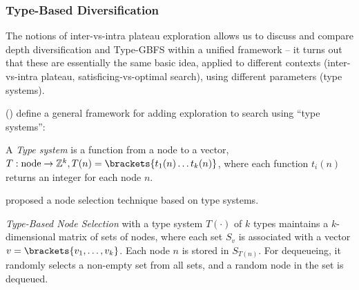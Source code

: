 \subsubsection{Type-Based Diversification}

The notions of inter-vs-intra plateau exploration allows us to discuss and compare depth diversification \cite{Asai2016} and Type-GBFS \cite{xie14type} within a unified framework
 -- it turns out that
these are essentially the same basic idea,  applied to different contexts (inter-vs-intra plateau, satisficing-vs-optimal search), using different parameters (type systems).

\citeauthor{lelis2013stratified} (\citeyear{lelis2013stratified}) define a general framework for adding exploration to search using ``type systems'':


\begin{defi} 
A \emph{Type system} \cite{lelis2013stratified} is a 
function from a node to a vector,
$T: \text{node} \rightarrow \mathbb{Z}^k, T(n)=\brackets{t_1(n) \ldots t_k(n)} $, where each function $t_i(n)$ returns an integer for each node $n$.
\end{defi}


\citeauthor{xie14type} proposed a node selection technique based on type systems.

\begin{defi}
 \emph{Type-Based Node Selection} \cite{xie14type}
with a type system $T(\cdot)$ of $k$ types maintains a $k$-dimensional matrix of sets of nodes,
 where each set $S_v$ is associated with a vector $v=\brackets{v_1,\ldots,v_k}$.
 Each node $n$ is stored in $S_{T(n)}$.
 For dequeueing, it randomly selects a non-empty set from all sets,
 and a random node in the set is dequeued.
\end{defi}

